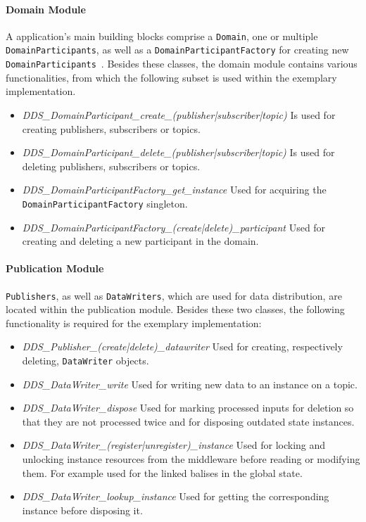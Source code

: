 \paragraph{Domain Module}
A  application's main building blocks comprise a \texttt{Domain}, one or multiple \texttt{DomainParticipants}, as well as a \texttt{DomainParticipantFactory} for creating new \texttt{DomainParticipants}~\cite{omgDDSspec}.
Besides these classes, the domain module contains various functionalities, from which the following subset is used within the exemplary implementation.

\begin{itemize}
\item \textit{DDS\_DomainParticipant\_create\_(publisher|subscriber|topic)} Is used for creating  publishers, subscribers or topics.
\item \textit{DDS\_DomainParticipant\_delete\_(publisher|subscriber|topic)} Is used for deleting  publishers, subscribers or topics.
\item \textit{DDS\_DomainParticipantFactory\_get\_instance} Used for acquiring the \texttt{DomainParticipantFactory} singleton.
\item \textit{DDS\_DomainParticipantFactory\_(create|delete)\_participant} Used for creating and deleting a new participant in the  domain.
\end{itemize}


\paragraph{Publication Module}
\texttt{Publishers}, as well as \texttt{DataWriters}, which are used for data distribution, are located within the publication module.
Besides these two classes, the following functionality is required for the exemplary implementation:

\begin{itemize}
\item \textit{DDS\_Publisher\_(create|delete)\_datawriter} Used for creating, respectively deleting, \texttt{DataWriter} objects.
\item \textit{DDS\_DataWriter\_write} Used for writing new data to an instance on a  topic.
\item \textit{DDS\_DataWriter\_dispose} Used for marking processed inputs for deletion so that they are not processed twice and for disposing outdated state instances.
\item \textit{DDS\_DataWriter\_(register|unregister)\_instance} Used for locking and unlocking instance resources from the middleware before reading or modifying them. For example used for the linked balises in the global state.
\item \textit{DDS\_DataWriter\_lookup\_instance} Used for getting the corresponding instance before disposing it.
\end{itemize}


